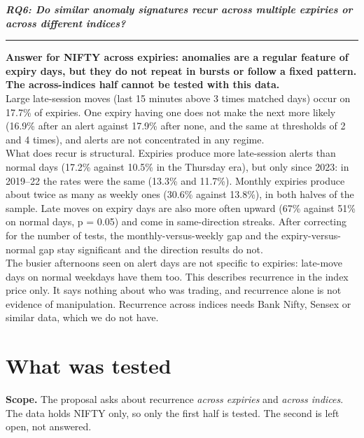\documentclass[10pt,a4paper]{article}
\begin{document}
{\raggedright\Large\bfseries\itshape RQ6: Do similar anomaly signatures recur across multiple expiries or across different indices?\par}
\vspace{2pt}\hrule\vspace{6pt}

\textbf{Answer for NIFTY across expiries: anomalies are a regular feature of expiry days, but they do not repeat in bursts or follow a fixed pattern. The across-indices half cannot be tested with this data.}\\
Large late-session moves (last 15 minutes above 3 times matched days) occur on 17.7\% of expiries. One expiry having one does not make the next more likely (16.9\% after an alert against 17.9\% after none, and the same at thresholds of 2 and 4 times), and alerts are not concentrated in any regime.\\
What does recur is structural. Expiries produce more late-session alerts than normal days (17.2\% against 10.5\% in the Thursday era), but only since 2023: in 2019--22 the rates were the same (13.3\% and 11.7\%). Monthly expiries produce about twice as many as weekly ones (30.6\% against 13.8\%), in both halves of the sample. Late moves on expiry days are also more often upward (67\% against 51\% on normal days, p = 0.05) and come in same-direction streaks. After correcting for the number of tests, the monthly-versus-weekly gap and the expiry-versus-normal gap stay significant and the direction results do not.\\
The busier afternoons seen on alert days are not specific to expiries: late-move days on normal weekdays have them too. This describes recurrence in the index price only. It says nothing about who was trading, and recurrence alone is not evidence of manipulation. Recurrence across indices needs Bank Nifty, Sensex or similar data, which we do not have.

\section*{What was tested}
\textbf{Scope.} The proposal asks about recurrence \emph{across expiries} and \emph{across indices}. The data holds NIFTY only, so only the first half is tested. The second is left open, not answered.
\end{document}
